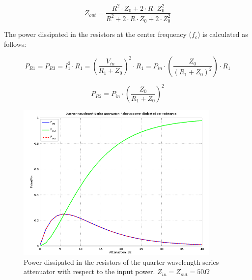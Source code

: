\begin{equation}
	Z_{out} = \frac{R^2 \cdot Z_0 + 2 \cdot R \cdot Z_0^2}{R^2 + 2 \cdot R \cdot Z_0 + 2 \cdot Z_0^2}
\end{equation}

\noindent The power dissipated in the resistors at the center frequency ($f_c$) is calculated as follows:

\begin{equation}
	P_{R1} = P_{R3} = I_1^2 \cdot R_1 = \left( \frac{V_{in}}{R_1 + Z_0}\right)^2 \cdot R_1= P_{in} \cdot \left( \frac{ Z_0}{(R_1 + Z_0)^2} \right) \cdot R_1
\end{equation}

\begin{equation}
	P_{R2} = P_{in} \cdot \left( \frac{Z_0}{R_1 + Z_0} \right)^2
\end{equation}

   \begin{figure}[ht]
    \centering
    \includegraphics[width=10cm]{./images/qw-series-relative-power-dissipation-50-Ohm.png}
    \caption{Power dissipated in the resistors of the quarter wavelength series attenuator with respect to the input power. $Z_{in} = Z_{out} = 50 \Omega$}
    \label{fig:qw-series-att-relative-power-dissipation-50-Ohm}
  \end{figure}